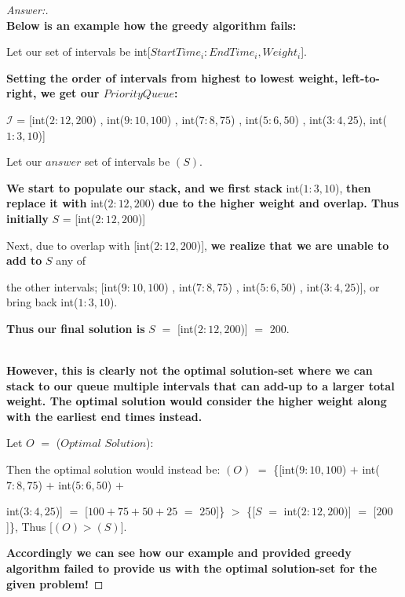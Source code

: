 \documentclass[11pt]{article}
\theoremstyle{definition}
\theoremstyle{definition}
\theoremstyle{definition}
\begin{document}
\begin{proof}[Answer:]
\item \textbf{\\ Below is an example how the greedy algorithm fails:}
\item \hspace*{10mm} Let our set of intervals be int[$StartTime_i:EndTime_i, Weight_i$].
\item \textbf{Setting the order of intervals from highest to lowest weight, left-to-right, we get our $PriorityQueue$:}
\item \hspace*{10mm} $\mathcal{I}$ = [int($2:12, 200$) , int($9:10, 100$) , int($7:8, 75$) , int($5:6, 50$) , int($3:4, 25$), int($1:3, 10$)]
\item \hspace*{10mm} Let our $answer$ set of intervals be $(S)$.
\item \textbf{We start to populate our stack, and we first stack} int($1:3, 10$), \textbf{then replace it with} int($2:12, 200$) \textbf{due to the higher weight and overlap. Thus initially} $S$ = [int($2:12, 200$)]
\item \hspace*{10mm} Next, due to overlap with [int($2:12, 200$)], \textbf{we realize that we are unable to add to} $S$ any of
\item \hspace*{10mm} the other intervals; [int($9:10, 100$) , int($7:8, 75$) , int($5:6, 50$) , int($3:4, 25$)], or bring back int($1:3, 10$).
\item \textbf{Thus our final solution is} $S$ $=$ [int($2:12, 200$)] $=$ $200$.
\item \textbf{\\ However, this is clearly not the optimal solution-set where we can stack to our queue multiple intervals that can add-up to a larger total weight. The optimal solution would consider the higher weight along with the earliest end times instead.}
\item \hspace*{10mm} Let $O$ $=$ ($Optimal$ $Solution$):
\item \hspace*{10mm} Then the optimal solution would instead be: $(O)$ $=$ \{[int($9:10, 100$) $+$ int($7:8, 75$) $+$ int($5:6, 50$) $+$ 
\item \hspace*{10mm} int($3:4, 25$)] $=$ [$100 + 75 + 50 + 25$ $=$ $250$]\} $>$ \{[$S$ $=$ int($2:12, 200$)] $=$ [$200$]\}, Thus [$(O)>(S)$].
\item \textbf{Accordingly we can see how our example and provided greedy algorithm failed to provide us with the optimal solution-set for the given problem!}

\end{proof}
\end{document}
